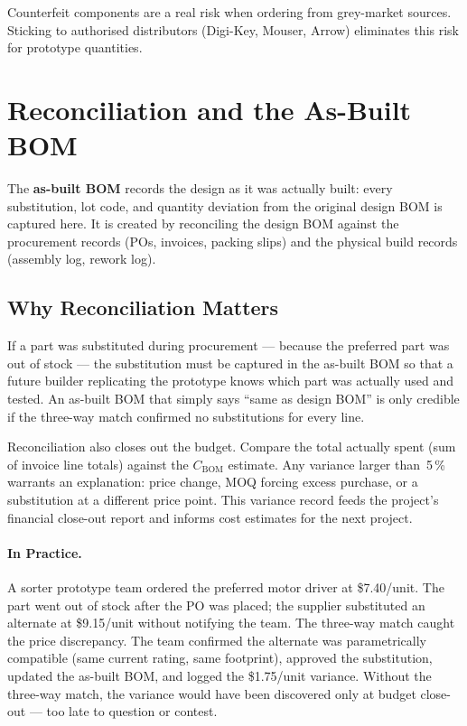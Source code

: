 Counterfeit components are a real risk when
ordering from grey-market sources.
Sticking to authorised distributors (Digi-Key, Mouser, Arrow) eliminates this
risk for prototype quantities.

\section{Reconciliation and the As-Built BOM}
\label{sec:ch11-asbuilt}

The \textbf{as-built BOM} records the design as it was actually built: every substitution, lot code, and quantity deviation from the original design BOM is captured here.
It is created by reconciling the design BOM against the procurement records
(POs, invoices, packing slips) and the physical build records (assembly log,
rework log).

\subsection{Why Reconciliation Matters}
\label{sec:ch11-reconcile-why}

If a part was substituted during procurement --- because the preferred part was
out of stock --- the substitution must be captured in the as-built BOM so that
a future builder replicating the prototype knows which part was actually used
and tested.
An as-built BOM that simply says ``same as design BOM'' is only credible if
the three-way match confirmed no substitutions for every line.

Reconciliation also closes out the budget.
Compare the total actually spent (sum of invoice line totals) against the
$C_{\text{BOM}}$ estimate.
Any variance larger than~5\,\% warrants an explanation: price change, MOQ
forcing excess purchase, or a substitution at a different price point.
This variance record feeds the project's financial close-out report and informs
cost estimates for the next project.

\paragraph{In Practice.}
A sorter prototype team ordered the preferred motor driver at \$7.40/unit.
The part went out of stock after the PO was placed; the supplier substituted an
alternate at \$9.15/unit without notifying the team.
The three-way match caught the price discrepancy.
The team confirmed the alternate was parametrically compatible (same current
rating, same footprint), approved the substitution, updated the as-built BOM,
and logged the \$1.75/unit variance.
Without the three-way match, the variance would have been discovered only at
budget close-out --- too late to question or contest.

